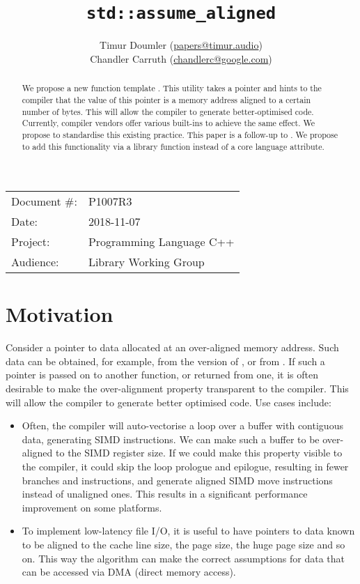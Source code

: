


\title{\texttt{std::assume_aligned}}
\author{
  Timur Doumler \small(\href{mailto:papers@timur.audio}{papers@timur.audio})  \\
  Chandler Carruth \small(\href{mailto:chandlerc@google.com}{chandlerc@google.com})
}
\date{}
\maketitle

\begin{tabular}{ll}
Document \#: & P1007R3 \\
Date: & 2018-11-07 \\
Project: & Programming Language C++ \\
Audience: & Library Working Group
\end{tabular}

\begin{abstract}
We propose a new function template . This utility takes a pointer and hints to the compiler that the value of this pointer is a memory address aligned to a certain number of bytes. This will allow the compiler to generate better-optimised code. Currently, compiler vendors offer various built-ins to achieve the same effect. We propose to standardise this existing practice. This paper is a follow-up to \cite{P0886R0}. We propose to add this functionality via a library function instead of a core language attribute.
\end{abstract}

\vspace{10mm}
\section{Motivation}
Consider a pointer to data allocated at an over-aligned memory address. Such data can be obtained, for example, from the \mbox{} version of , or from . If such a pointer is passed on to another function, or returned from one, it is often desirable to make the over-alignment property transparent to the compiler. This will allow the compiler to generate better optimised code. Use cases include:

\begin{itemize}
\item Often, the compiler will auto-vectorise a loop over a buffer with contiguous data, generating SIMD instructions. We can make such a buffer  to be over-aligned to the SIMD register size. If we could make this property visible to the compiler, it could skip the loop prologue and epilogue, resulting in fewer branches and instructions, and generate aligned SIMD move instructions instead of unaligned ones. This results in a significant performance improvement on some platforms.
\item To implement low-latency file I/O, it is useful to have pointers to data known to be aligned to the cache line size, the page size, the huge page size and so on. This way the algorithm can make the correct assumptions for data that can be accessed via DMA (direct memory access).
\end{itemize}

